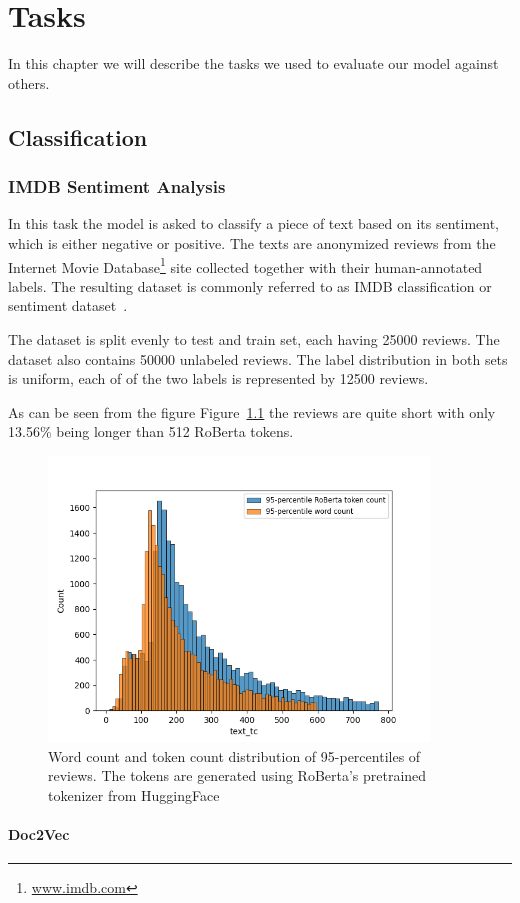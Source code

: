 \chapter{Tasks}

In this chapter we will describe the tasks we used to evaluate our model against
others.

\section{Classification}

\subsection{IMDB Sentiment Analysis}

In this task the model is asked to classify a piece of text based on its
sentiment, which is either negative or positive. The texts are anonymized
reviews from the Internet Movie Database\footnote{\url{www.imdb.com}} site
collected together with their human-annotated labels. The resulting dataset is
commonly referred to as IMDB classification or sentiment dataset~\cite{maas11}.

The dataset is split evenly to test and train set, each having 25000 reviews.
The dataset also contains 50000 unlabeled reviews. The label distribution in
both sets is uniform, each of of the two labels is represented by 12500 reviews.

As can be seen from the figure Figure~\ref{fig:imdb_word_token_dist} the reviews
are quite short with only 13.56\% being longer than 512 RoBerta tokens.

\begin{figure}[h]
  \centering
  \includegraphics[width=0.9\textwidth]{img/imdb_word_token_distributions.png}
  \caption{Word count and token count distribution of 95-percentiles of
  reviews. The tokens are generated using RoBerta's pretrained tokenizer from
  HuggingFace}\label{fig:imdb_word_token_dist}
\end{figure}


\subsubsection{Doc2Vec}

